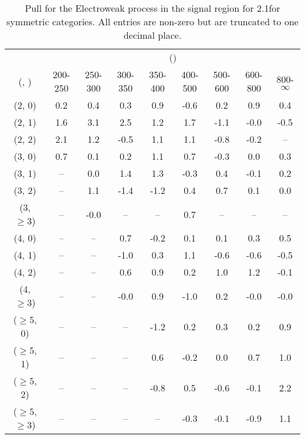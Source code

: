 \begin{table}[h!]
\tiny
\centering
\caption{Pull for the Electroweak process in the signal region for 2.1\ifb for symmetric categories. All entries are non-zero but are truncated to one decimal place.\label{tab:pullsep_sig_ewk_sym}}
\begin{tabular}
{ccccccccc}
	\hline\hline
	& \multicolumn{8}{c}{\scalht (\gev)} \\ 
	 (\njet,  \nb) & 200-250 & 250-300 & 300-350 & 350-400 & 400-500 & 500-600 & 600-800 & 800-$\infty$ \\ [0.8ex] 
\hline
	(2, 0) & 0.2 & 0.4 & 0.3 & 0.9 & -0.6 & 0.2 & 0.9 & 0.4 \\[0.5ex] 
	(2, 1) & 1.6 & 3.1 & 2.5 & 1.2 & 1.7 & -1.1 & -0.0 & -0.5 \\[0.5ex] 
	(2, 2) & 2.1 & 1.2 & -0.5 & 1.1 & 1.1 & -0.8 & -0.2 & -- \\[0.5ex] 
	(3, 0) & 0.7 & 0.1 & 0.2 & 1.1 & 0.7 & -0.3 & 0.0 & 0.3 \\[0.5ex] 
	(3, 1) & -- & 0.0 & 1.4 & 1.3 & -0.3 & 0.4 & -0.1 & 0.2 \\[0.5ex] 
	(3, 2) & -- & 1.1 & -1.4 & -1.2 & 0.4 & 0.7 & 0.1 & 0.0 \\[0.5ex] 
	(3, $\ge3$) & -- & -0.0 & -- & -- & 0.7 & -- & -- & -- \\[0.5ex] 
	(4, 0) & -- & -- & 0.7 & -0.2 & 0.1 & 0.1 & 0.3 & 0.5 \\[0.5ex] 
	(4, 1) & -- & -- & -1.0 & 0.3 & 1.1 & -0.6 & -0.6 & -0.5 \\[0.5ex] 
	(4, 2) & -- & -- & 0.6 & 0.9 & 0.2 & 1.0 & 1.2 & -0.1 \\[0.5ex] 
	(4, $\ge3$) & -- & -- & -0.0 & 0.9 & -1.0 & 0.2 & -0.0 & -0.0 \\[0.5ex] 
	($\ge5$, 0) & -- & -- & -- & -1.2 & 0.2 & 0.3 & 0.2 & 0.9 \\[0.5ex] 
	($\ge5$, 1) & -- & -- & -- & 0.6 & -0.2 & 0.0 & 0.7 & 1.0 \\[0.5ex] 
	($\ge5$, 2) & -- & -- & -- & -0.8 & 0.5 & -0.6 & -0.1 & 2.2 \\[0.5ex] 
	($\ge5$, $\ge3$) & -- & -- & -- & -- & -0.3 & -0.1 & -0.9 & 1.1 \\[0.5ex] 
	\hline
	\hline
\end{tabular}
\end{table}
